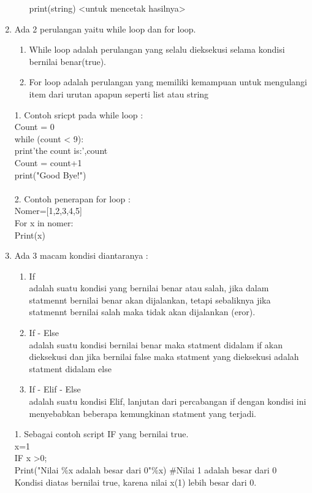 \begin{enumerate}
\begin{enumerate}
print(string) <untuk mencetak hasilnya> \\ 
\end{enumerate}
\item
Ada 2 perulangan yaitu while loop dan for loop. 
\begin{enumerate}
\item
While loop adalah perulangan yang selalu dieksekusi selama kondisi bernilai benar(true).
\item
For loop adalah perulangan yang memiliki kemampuan untuk mengulangi item dari urutan apapun seperti list atau string
\end{enumerate} 
1. Contoh sricpt pada while loop : \\
Count = 0 \\
while (count < 9): \\
print'the count is:',count \\
Count = count+1 \\
print("Good Bye!") \\ \\
2. Contoh penerapan for loop : \\
Nomer=[1,2,3,4,5] \\
For x in nomer: \\
Print(x)\\
\item
Ada 3 macam kondisi diantaranya : 
\begin{enumerate}
\item
If \\ adalah suatu kondisi yang bernilai benar atau salah, jika dalam statmennt bernilai benar akan dijalankan, tetapi sebaliknya jika statmennt bernilai salah maka tidak akan dijalankan (eror). 
\item
If - Else \\ adalah suatu kondisi bernilai benar maka statment didalam if akan dieksekusi dan jika bernilai false maka statment yang dieksekusi adalah statment didalam else
\item
If - Elif - Else \\ adalah suatu kondisi Elif, lanjutan dari percabangan  if dengan kondisi ini menyebabkan beberapa kemungkinan statment yang terjadi.
\end{enumerate}
1. Sebagai contoh script IF yang bernilai true. \\
x=1 \\
IF x >0; \\
Print("Nilai \%x adalah besar dari 0"\%x) \#Nilai 1 adalah besar dari 0 \\
Kondisi diatas bernilai true, karena nilai x(1) lebih besar dari 0. \\ \\

\end{enumerate}
